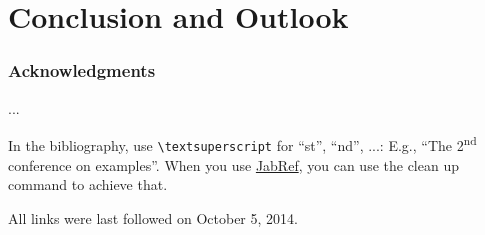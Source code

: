 \documentclass[runningheads,a4paper]{llncs}
\newcommand{\commentatside}[1]{\pdfcomment[color={0.045 0.278 0.643},icon=Note]{#1}}
\newcommand{\todo}[1]{\commentatside{#1}}
\begin{document}


%
%

%
%
%
%
%
%
%

\section{Conclusion and Outlook}

\subsubsection*{Acknowledgments}
...

In the bibliography, use \texttt{\textbackslash textsuperscript} for ``st'', ``nd'', ...:
E.g., \enquote{The 2\textsuperscript{nd} conference on examples}.
When you use \href{http://www.jabref.org}{JabRef}, you can use the clean up command to achieve that.




All links were last followed on October 5, 2014.
\end{document}
